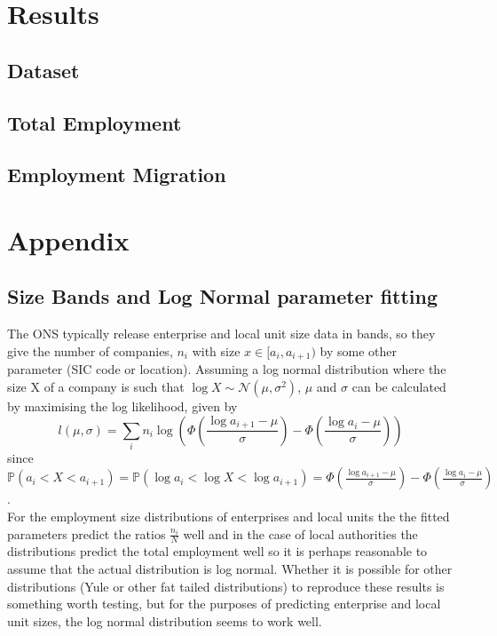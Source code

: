 \documentclass[a4paper,10pt]{article}
\begin{document}
\section{Results}
\subsection{Dataset}
\subsection{Total Employment}
\subsection{Employment Migration}

\section{Appendix}
\subsection{Size Bands and Log Normal parameter fitting}
The ONS typically release enterprise and local unit size data in bands, so they give the number of companies, $n_i$ with size $x \in [a_i, a_{i+1})$ by some other parameter (SIC code or location). Assuming a log normal distribution where the size X of a company is such that $\log X \sim \mathcal{N}(\mu, \sigma^2)$, $\mu$ and $\sigma$ can be calculated by maximising the log likelihood, given by
\begin{equation}
 l(\mu, \sigma) = \sum_i n_i \log \left( \Phi \left( \frac{\log a_{i + 1} - \mu}{\sigma} \right) - \Phi \left( \frac{\log a_{i} - \mu}{\sigma} \right) \right)
\end{equation}
since $\mathbb{P}(a_i < X < a_{i + 1}) = \mathbb{P}(\log a_i < \log X < \log a_{i + 1}) = \Phi \left( \frac{\log a_{i + 1} - \mu}{\sigma} \right) - \Phi \left( \frac{\log a_{i} - \mu}{\sigma} \right)$. \\
For the employment size distributions of enterprises and local units the the fitted parameters predict the ratios $\frac{n_i}{N}$ well and in the case of local authorities the distributions predict the total employment well so it is perhaps reasonable to assume that the actual distribution is log normal. Whether it is possible for other distributions (Yule or other fat tailed distributions) to reproduce these results is something worth testing, but for the purposes of predicting enterprise and local unit sizes, the log normal distribution seems to work well.
\end{document}
